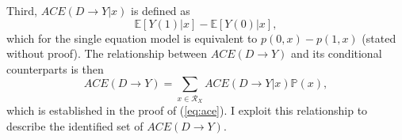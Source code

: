 \documentclass[12pt,a4paper,twoside]{article}
\DeclareRobustCommand{\stirling}{\genfrac\{\}{0pt}{}}
\numberwithin{equation}{section}
\begin{document}
Third, $ACE(D\rightarrow Y|x)$ is defined as 
\[\mathbb{E}[Y(1)|x]-\mathbb{E}[Y(0)|x],\]
which for the single equation model is equivalent to $p(0,x)-p(1,x)$ (stated without proof). The relationship between $ACE(D\rightarrow Y)$ and its conditional counterparts is then 
\begin{equation}
ACE(D\rightarrow Y)=\sum_{x\in\mathcal{R}_X}ACE(D\rightarrow Y|x)\mathbb{P}(x),\label{eq:relationship}
\end{equation}
which is established in the proof of (\ref{eq:ace}). I exploit this relationship to describe the identified set of $ACE(D\rightarrow Y)$.  
%
\end{document}
